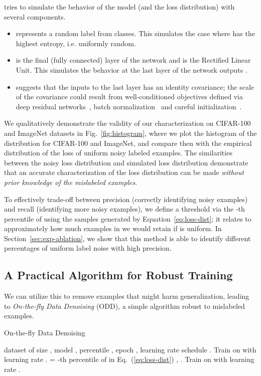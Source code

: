 \documentclass[a4paper,11pt]{article}
\begin{document}
 tries to simulate the behavior of the model (and the loss distribution) with several components.
\begin{itemize}
    \item  represents a random label from  classes. This simulates the case where  has the highest entropy, i.e. uniformly random.
    \item  is the final (fully connected) layer of the network and  is the Rectified Linear Unit. This simulates the behavior at the last layer of the network outputs .
    \item  suggests that the inputs to the last layer has an identity covariance; the scale of the covariance could result from well-conditioned objectives defined via deep residual networks~\cite{he2015deep}, batch normalization~\cite{ioffe2015batch} and careful initialization~\cite{he2015delving}.
\end{itemize}
We qualitatively demonstrate the validity of our characterization on CIFAR-100 and ImageNet datasets in Fig.~\ref{fig:histogram}, where we plot the histogram of the  distribution for CIFAR-100 and ImageNet, and compare then with the empirical distribution of the loss of uniform noisy labeled examples.
The similarities between the noisy loss distribution and simulated loss distribution  demonstrate that an accurate characterization of the loss distribution can be made \textit{without prior knowledge of the mislabeled examples}. 


To effectively trade-off between precision (correctly identifying noisy examples) and recall (identifying more noisy examples), we define a threshold via the -th percentile of  using the samples generated by Equation~\ref{eq:loss-dist}; it relates to approximately how much examples in  we would retain if  is uniform. In Section~\ref{sec:exp-ablation}, we show that this method is able to identify different percentages of uniform label noise with high precision.



\subsection{A Practical Algorithm for Robust Training}
We can utilize this to remove examples that might harm generalization, leading to \textit{On-the-fly Data Denoising} (\textsc{ODD}), a simple algorithm robust to mislabeled examples.

\begin{algorithm}
  \caption{On-the-fly Data Denoising}
  \label{alg:odd}
\begin{algorithmic}
   dataset  of size , model , percentile , epoch , learning rate schedule .
  \FOR{}
  \STATE Train on  with learning rate .
  \ENDFOR
  \STATE  = -th percentile of  in Eq.~(\ref{eq:loss-dist}) 
  \STATE , .
  \FOR{}
  \STATE Train on  with learning rate .
  \ENDFOR
\end{algorithmic}
\end{algorithm}
\end{document}
